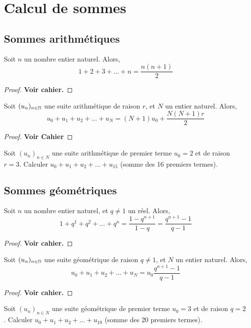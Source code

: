 \documentclass{poly}
\begin{document}
\section{Calcul de sommes}
\subsection{Sommes arithmétiques}
\begin{proposition}
Soit $n$ un nombre entier naturel. Alors,
\begin{equation*}
1 + 2 + 3 + \dots + n = \dfrac{n(n+1)}{2}
\end{equation*}
\end{proposition}
\begin{proof}
\textbf{Voir cahier.}
\end{proof}
\begin{proposition}
Soit $(u_n)_{n \in \mathbb{N}}$ une suite arithmétique de raison $r$, et $N$ un entier naturel. Alors,
\begin{equation*}
u_0 + u_1 + u_2 + \dots + u_N = (N+1)u_0 + \dfrac{N(N+1)r}{2}
\end{equation*}
\end{proposition}
\begin{proof}
\textbf{Voir Cahier}
\end{proof}
\begin{example}
Soit $(u_n)_{n \in N}$ une suite arithmétique de premier terme $u_0 = 2$ et de raison $r = 3$. Calculer $u_0 + u_1 + u_2 + \dots + u_{15}$ (somme des 16 premiers termes).
\end{example}
\subsection{Sommes géométriques}
\begin{proposition}
Soit $n$ un nombre entier naturel, et $q \neq 1$ un réel. Alors,
\begin{equation*}
1 + q^1 + q^2 + \dots + q^n = \dfrac{1 - q^{n+1}}{1 - q} = \dfrac{q^{n+1} - 1}{q - 1}
\end{equation*}
\end{proposition}
\begin{proof}
\textbf{Voir cahier.}
\end{proof}
\begin{proposition}
Soit $(u_n)_{n \in \mathbb{N}}$ une suite géométrique de raison $q \neq 1$, et $N$ un entier naturel. Alors,
\begin{equation*}
u_0 + u_1 + u_2 + \dots + u_N = u_0 \dfrac{q^{n+1} - 1}{q - 1}
\end{equation*}
\end{proposition}
\begin{proof}
\textbf{Voir cahier.}
\end{proof}
\begin{example}
Soit $(u_n)_{n \in N}$ une suite géométrique de premier terme $u_0 = 3$ et de raison $q = 2$. Calculer $u_0 + u_1 + u_2 + \dots + u_{19}$ (somme des 20 premiers termes).
\end{example}
\end{document}

